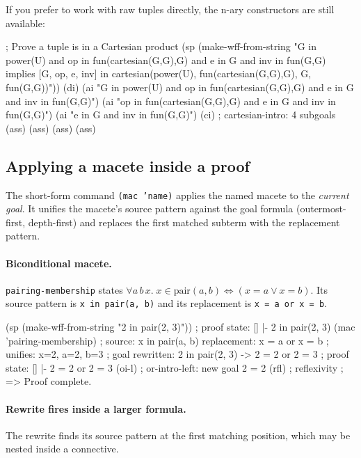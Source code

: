 If you prefer to work with raw tuples directly, the n-ary constructors
are still available:
\begin{VNBcode}
; Prove a tuple is in a Cartesian product
(sp (make-wff-from-string
  "G in power(U) and op in fun(cartesian(G,G),G) and e in G and inv in fun(G,G)
   implies [G, op, e, inv]
   in cartesian(power(U), fun(cartesian(G,G),G), G, fun(G,G))"))
(di)
(ai "G in power(U) and op in fun(cartesian(G,G),G) and e in G and inv in fun(G,G)")
(ai "op in fun(cartesian(G,G),G) and e in G and inv in fun(G,G)")
(ai "e in G and inv in fun(G,G)")
(ci)                              ; cartesian-intro: 4 subgoals
(ass) (ass) (ass) (ass)
\end{VNBcode}

\subsection{Applying a macete inside a proof}

The short-form command \texttt{(mac 'name)} applies the named macete to
the \emph{current goal}.  It unifies the macete's source pattern against
the goal formula (outermost-first, depth-first) and replaces the first
matched subterm with the replacement pattern.

\paragraph{Biconditional macete.}
\texttt{pairing-membership} states
$\forall a\,b\,x.\;x \in \mathrm{pair}(a,b) \Leftrightarrow (x=a \vee x=b)$.
Its source pattern is \verb|x in pair(a, b)| and its replacement is
\verb|x = a or x = b|.

\begin{VNBcode}
(sp (make-wff-from-string "2 in pair(2, 3)"))
; proof state:  []  |-  2 in pair(2, 3)
(mac 'pairing-membership)
; source: x in pair(a, b)   replacement: x = a or x = b
; unifies: x=2, a=2, b=3
; goal rewritten:  2 in pair(2, 3)  ->  2 = 2 or 2 = 3
; proof state:  []  |-  2 = 2 or 2 = 3
(oi-l)      ; or-intro-left: new goal  2 = 2
(rfl)       ; reflexivity
; => Proof complete.
\end{VNBcode}

\paragraph{Rewrite fires inside a larger formula.}
The rewrite finds its source pattern at the first matching position,
which may be nested inside a connective.

